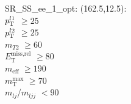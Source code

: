 SR\_SS\_ee\_1\_opt: (162.5,12.5): \\
$p_{\text{T}}^{l1}$ $\geq 25$ \\
$p_{\text{T}}^{l2}$ $\geq 25$ \\
$m_{T2}$ $\geq 60$ \\
$E_{\text{T}}^{\text{miss,rel}}$ $\geq 80$ \\
$m_{\text{eff}}$ $\geq 190$ \\
$m_{\text{T}}^{\text{max}}$ $\geq 70$ \\
$m_{lj}$/$m_{ljj}$ $<90$ \\
